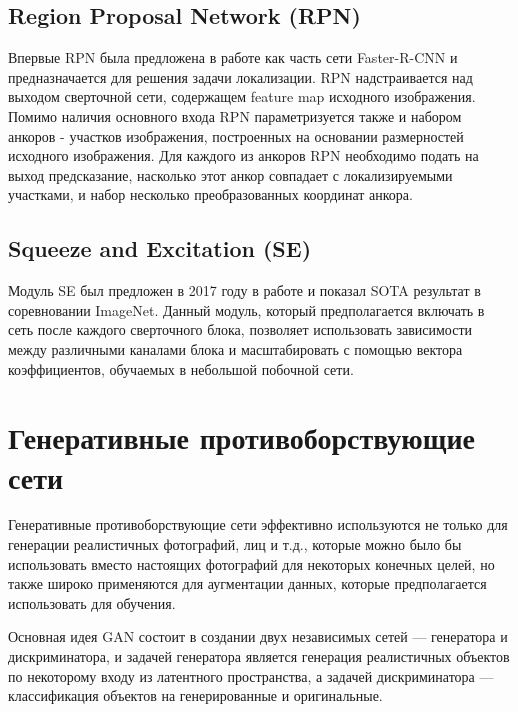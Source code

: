   

\subsection{Region Proposal Network (RPN)} 

  

Впервые RPN была предложена в работе \cite{ren2015faster} как часть сети Faster-R-CNN и предназначается для решения задачи локализации. RPN надстраивается над выходом сверточной сети, содержащем feature map исходного изображения. Помимо наличия основного входа RPN параметризуется также и набором анкоров - участков изображения, построенных на основании размерностей исходного изображения. Для каждого из анкоров RPN необходимо подать на выход предсказание, насколько этот анкор совпадает с локализируемыми участками, и набор несколько преобразованных координат анкора. 

  

\subsection{Squeeze and Excitation (SE)} 

  

Модуль SE был предложен в 2017 году в работе \cite{hu2018squeeze} и показал SOTA результат в соревновании ImageNet. Данный модуль, который предполагается включать в сеть после каждого сверточного блока, позволяет использовать зависимости между различными каналами блока и масштабировать с помощью вектора коэффициентов, обучаемых в небольшой побочной сети. 

  

\section{Генеративные противоборствующие сети} 

  

Генеративные противоборствующие сети эффективно используются не только для генерации реалистичных фотографий, лиц и т.д., которые можно было бы использовать вместо настоящих фотографий для некоторых конечных целей, но также широко применяются для аугментации данных, которые предполагается использовать для обучения. 

  

Основная идея GAN состоит в создании двух независимых сетей --- генератора и дискриминатора, и задачей генератора является генерация реалистичных объектов по некоторому входу из латентного пространства, а задачей дискриминатора --- классификация объектов на генерированные и оригинальные. 

